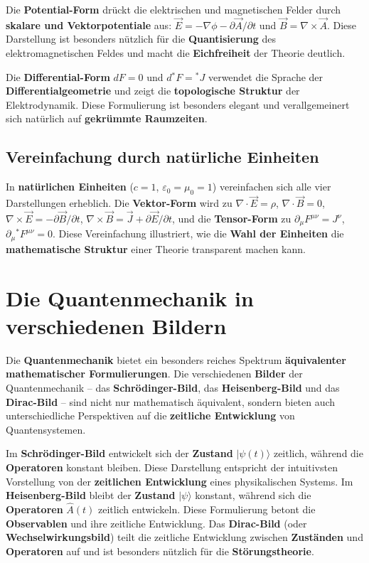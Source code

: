 \documentclass[12pt,a4paper]{report}
\begin{document}
	Die \textbf{Potential-Form} drückt die elektrischen und magnetischen Felder durch \textbf{skalare und Vektorpotentiale} aus: $\vec{E} = -\nabla \phi - \partial \vec{A}/\partial t$ und $\vec{B} = \nabla \times \vec{A}$. Diese Darstellung ist besonders nützlich für die \textbf{Quantisierung} des elektromagnetischen Feldes und macht die \textbf{Eichfreiheit} der Theorie deutlich.
	
	Die \textbf{Differential-Form} $dF = 0$ und $d{}^*F = {}^*J$ verwendet die Sprache der \textbf{Differentialgeometrie} und zeigt die \textbf{topologische Struktur} der Elektrodynamik. Diese Formulierung ist besonders elegant und verallgemeinert sich natürlich auf \textbf{gekrümmte Raumzeiten}.
	
	\subsection{Vereinfachung durch natürliche Einheiten}
	
	In \textbf{natürlichen Einheiten} ($c = 1$, $\varepsilon_0 = \mu_0 = 1$) vereinfachen sich alle vier Darstellungen erheblich. Die \textbf{Vektor-Form} wird zu $\nabla \cdot \vec{E} = \rho$, $\nabla \cdot \vec{B} = 0$, $\nabla \times \vec{E} = -\partial \vec{B}/\partial t$, $\nabla \times \vec{B} = \vec{J} + \partial \vec{E}/\partial t$, und die \textbf{Tensor-Form} zu $\partial_\mu F^{\mu\nu} = J^\nu$, $\partial_\mu {}^*F^{\mu\nu} = 0$. Diese Vereinfachung illustriert, wie die \textbf{Wahl der Einheiten} die \textbf{mathematische Struktur} einer Theorie transparent machen kann.
	
	\section{Die Quantenmechanik in verschiedenen Bildern}
	
	Die \textbf{Quantenmechanik} bietet ein besonders reiches Spektrum \textbf{äquivalenter mathematischer Formulierungen}. Die verschiedenen \textbf{Bilder} der Quantenmechanik -- das \textbf{Schrödinger-Bild}, das \textbf{Heisenberg-Bild} und das \textbf{Dirac-Bild} -- sind nicht nur mathematisch äquivalent, sondern bieten auch unterschiedliche Perspektiven auf die \textbf{zeitliche Entwicklung} von Quantensystemen.
	
	Im \textbf{Schrödinger-Bild} entwickelt sich der \textbf{Zustand} $|\psi(t)\rangle$ zeitlich, während die \textbf{Operatoren} konstant bleiben. Diese Darstellung entspricht der intuitivsten Vorstellung von der \textbf{zeitlichen Entwicklung} eines physikalischen Systems. Im \textbf{Heisenberg-Bild} bleibt der \textbf{Zustand} $|\psi\rangle$ konstant, während sich die \textbf{Operatoren} $\hat{A}(t)$ zeitlich entwickeln. Diese Formulierung betont die \textbf{Observablen} und ihre zeitliche Entwicklung. Das \textbf{Dirac-Bild} (oder \textbf{Wechselwirkungsbild}) teilt die zeitliche Entwicklung zwischen \textbf{Zuständen} und \textbf{Operatoren} auf und ist besonders nützlich für die \textbf{Störungstheorie}.
	
\end{document}
